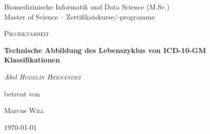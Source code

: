 \begin{titlepage}
		\thispagestyle{firstpage}
		\raggedright
		{\Large {\color{orange}Biomedizinische Informatik und Data Science (M.Sc.)\\}
			{\color{gray}Master of Science – Zertifikatskurse/-programme}
			\par}
		\vspace{1cm}
		\centering
		{\scshape\LARGE Projektarbeit\par}
		\vspace{1.5cm}
		{\huge \bfseries Technische Abbildung des Lebenszyklus von ICD-10-GM Klassifikationen\par}
		\vspace{2cm}
		{\Large \itshape Abel \textsc{Hodel\'in Hern\'andez}~\par}
		\vfill
		betreut von\par
		Marcus \textsc{Will}
		
		\vfill
		
		{\large \today\par}
	\end{titlepage}